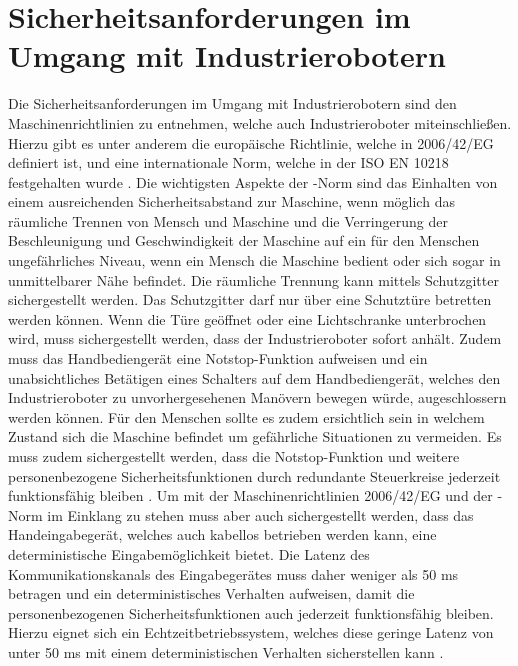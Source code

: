 \section{Sicherheitsanforderungen im Umgang mit Industrierobotern}
Die Sicherheitsanforderungen im Umgang mit Industrierobotern sind den Maschinenrichtlinien zu entnehmen, welche auch Industrieroboter miteinschließen. Hierzu gibt es unter anderem die europäische Richtlinie, welche in 2006/42/EG definiert ist, und eine internationale Norm, welche in der ISO EN 10218 festgehalten wurde \cite{noauthor_industrieroboter_2020}. Die wichtigsten Aspekte der -Norm sind das Einhalten von einem ausreichenden Sicherheitsabstand zur Maschine, wenn möglich das räumliche Trennen von Mensch und Maschine und die Verringerung der Beschleunigung und Geschwindigkeit der Maschine auf ein für den Menschen ungefährliches Niveau, wenn ein Mensch die Maschine bedient oder sich sogar in unmittelbarer Nähe befindet. Die räumliche Trennung kann mittels Schutzgitter sichergestellt werden. Das Schutzgitter darf nur über eine Schutztüre betretten werden können. Wenn die Türe geöffnet oder eine Lichtschranke unterbrochen wird, muss sichergestellt werden, dass der Industrieroboter sofort anhält. Zudem muss das Handbediengerät eine Notstop-Funktion aufweisen und ein unabsichtliches Betätigen eines Schalters auf dem Handbediengerät, welches den Industrieroboter zu unvorhergesehenen Manövern bewegen würde, augeschlossern werden können. Für den Menschen sollte es zudem ersichtlich sein in welchem Zustand sich die Maschine befindet um gefährliche Situationen zu vermeiden. Es muss zudem sichergestellt werden, dass die Notstop-Funktion und weitere personenbezogene Sicherheitsfunktionen durch redundante Steuerkreise jederzeit funktionsfähig bleiben \cite{behnisch_iso_2008}. Um mit der Maschinenrichtlinien 2006/42/EG und der -Norm im Einklang zu stehen muss aber auch sichergestellt werden, dass das Handeingabegerät, welches auch kabellos betrieben werden kann, eine deterministische Eingabemöglichkeit bietet. Die Latenz des Kommunikationskanals des Eingabegerätes muss daher weniger als 50 ms betragen und ein deterministisches Verhalten aufweisen, damit die personenbezogenen Sicherheitsfunktionen auch jederzeit funktionsfähig bleiben. Hierzu eignet sich ein Echtzeitbetriebssystem, welches diese geringe Latenz von unter 50 ms mit einem deterministischen Verhalten sicherstellen kann \cite[55]{prassler_advances_2004}.

